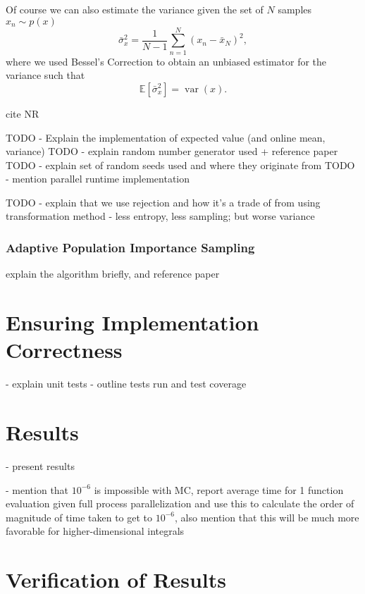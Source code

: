 \documentclass[10pt, a4paper]{article}
\begin{document}
  Of course we can also estimate the variance given the set of $N$ \iid{} samples $x_n \sim p(x)$
  \begin{equation}
  \bar{\sigma}_x^2 = \frac{1}{N-1} \sum_{n=1}^N (x_n - \bar{x}_N)^2,
  \end{equation}
  where we used Bessel's Correction\cite{nr} to obtain an unbiased estimator for the variance such
  that
  \begin{equation}
  \mathbb{E}\left[\bar{\sigma}_x^2\right] = \operatorname{var}(x).
  \end{equation}


  cite NR

  TODO - Explain the implementation of expected value (and online mean, variance)
  TODO - explain random number generator used + reference paper
  TODO - explain set of random seeds used and where they originate from
  TODO - mention parallel runtime implementation

  TODO - explain that we use rejection and how it's a trade of from using transformation method
         - less entropy, less sampling; but worse variance 

  \subsubsection{Adaptive Population Importance Sampling}
  explain the \apis{} algorithm briefly, and reference paper

\section{Ensuring Implementation Correctness}

- explain unit tests
- outline tests run and test coverage

\section{Results}

- present results

- mention that $10^{-6}$ is impossible with MC, report average time for 1 function evaluation given
  full process parallelization and use this to calculate the order of magnitude of time taken to
  get to $10^{-6}$, also mention that this will be much more favorable for higher-dimensional integrals

\section{Verification of Results}
\end{document}
